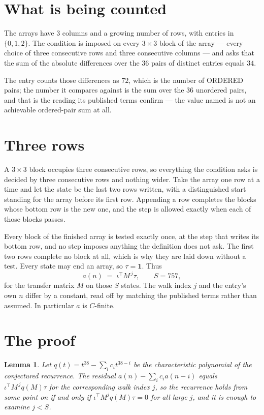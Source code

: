 \documentclass[11pt,a4paper]{article}
\theoremstyle{plain}
\newtheorem{lemma}[theorem]{Lemma}
\theoremstyle{definition}
\begin{document}
\section{What is being counted}

The arrays have $3$ columns and a growing number of rows, with entries in $\{0,1,2\}$. The
condition is imposed on every $3\times3$ block of the array --- every choice of three
consecutive rows and three consecutive columns --- and asks that the sum of the absolute differences over the $36$ pairs of distinct entries equals $34$.

The entry counts those differences as $72$, which is the number of ORDERED pairs; the number it compares against is the sum over the $36$ unordered pairs, and that is the reading its published terms confirm --- the value named is not an achievable ordered-pair sum at all.

\section{Three rows}

A $3\times3$ block occupies three consecutive rows, so everything the condition asks is decided
by three consecutive rows and nothing wider. Take the array one row at a time and let the state
be the last two rows written, with a distinguished start standing for the array before its
first row. Appending a row completes the blocks whose bottom row is the new one, and the step
is allowed exactly when each of those blocks passes.

Every block of the finished array is tested exactly once, at the step that writes its bottom
row, and no step imposes anything the definition does not ask. The first two rows complete no
block at all, which is why they are laid down without a test. Every state may end an array, so
$\tau=\mathbf{1}$. Thus
\[
a(n)\;=\;\iota^{\!\top}M^{\,j}\tau ,\qquad S=757,
\]
for the transfer matrix $M$ on those $S$ states. The walk index $j$ and the entry's own $n$
differ by a constant, read off by matching the published terms rather than assumed. In
particular $a$ is $C$-finite.

\section{The proof}

\begin{lemma}\label{lem:crit}
Let $q(t)=t^{38}-\sum_i c_it^{38-i}$ be the characteristic polynomial of the
conjectured recurrence. The residual $a(n)-\sum_ic_ia(n-i)$ equals
$\iota^{\!\top}M^{\,j}q(M)\tau$ for the corresponding walk index $j$, so the recurrence
holds from some point on if and only if $\iota^{\!\top}M^{j}q(M)\tau=0$ for all large $j$,
and it is enough to examine $j<S$.
\end{lemma}
\end{document}
